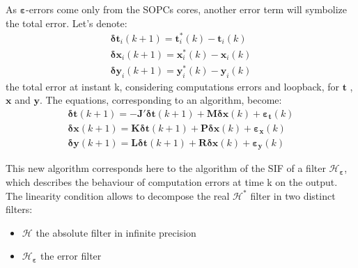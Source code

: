 	As $\boldsymbol{\varepsilon}$-errors come only from the SOPCs cores, another error term will symbolize the total error.
			Let's denote:
			\begin{eqnarray}
			\boldsymbol{\delta t}_i(k+1)=\boldsymbol{t}_i^*(k)-\boldsymbol{t}_i(k) \\
			\boldsymbol{\delta x}_i(k+1)=\boldsymbol{x}_i^*(k)-\boldsymbol{x}_i(k) \\
			\boldsymbol{\delta y}_i(k+1)=\boldsymbol{y}_i^*(k)-\boldsymbol{y}_i(k) 
			\end{eqnarray}
			the total error at instant k,
			considering computations errors and loopback, for 
			$\boldsymbol{t}$ , $\boldsymbol{x}$ and $\boldsymbol{y}$.
			The equations, corresponding to an algorithm, become:
			\begin{eqnarray} \label{deltaerr}
				\boldsymbol{\delta t}(k+1) = - \boldsymbol{J'}\boldsymbol{\delta t}(k+1) + \boldsymbol{M} \boldsymbol{\delta x}(k) + \boldsymbol{\varepsilon_t}(k)\\
				\boldsymbol{\delta x}(k+1) = \boldsymbol{K}\boldsymbol{\delta t}(k+1) + \boldsymbol{P} \boldsymbol{\delta x}(k) + \boldsymbol{\varepsilon_x}(k) \\
				\boldsymbol{\delta y}(k+1) = \boldsymbol{L}\boldsymbol{\delta t}(k+1) + \boldsymbol{R} \boldsymbol{\delta x}(k) + \boldsymbol{\varepsilon_y}(k) 
			\end{eqnarray}

			This new algorithm corresponds here to the algorithm of the SIF of a filter $\mathcal{H}_{\boldsymbol{\varepsilon}}$,
			which describes the behaviour of computation errors at time k on the output.
			The linearity condition allows to decompose the real $\mathcal{H}^*$ filter in two distinct filters:
			\begin{itemize}
				\item $\mathcal{H}$ the absolute filter in infinite precision
				\item $\mathcal{H}_{\boldsymbol{\varepsilon}}$ the error filter
			\end{itemize}

